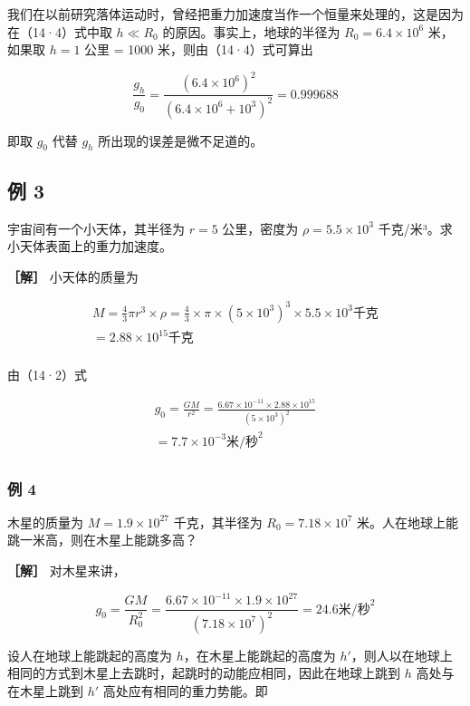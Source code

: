 我们在以前研究落体运动时，曾经把重力加速度当作一个恒量来处理的，这是因为在（14·4）式中取
\(h \ll R_{0}\) 的原因。事实上，地球的半径为
\(R_{0} = 6.4 \times 10^{6}\) 米，如果取 \(h = 1\) 公里 = 1000
米，则由（14·4）式可算出

\[
\frac {g _ {h}}{g _ {0}} = \frac {(6.4 \times 10 ^ {6}) ^ {2}}{(6.4 \times 10 ^ {6} + 10 ^ {3}) ^ {2}} = 0.999688
\]

即取 \(g_0\) 代替 \(g_h\) 所出现的误差是微不足道的。

\subsection{例 3}\label{ux4f8b-3-12}

宇宙间有一个小天体，其半径为 \(r = 5\) 公里，密度为
\(\rho = 5.5 \times 10^{3}\) 千克/米³。求小天体表面上的重力加速度。

\textbf{［解］} 小天体的质量为

\[
\begin{array}{l} M = \frac {4}{3} \pi r ^ {3} \times \rho = \frac {4}{3} \times \pi \times (5 \times 10 ^ {3}) ^ {3} \times 5.5 \times 10 ^ {3} \text{千克} \\ = 2.88 \times 10 ^ {15} \text{千克} \\ \end{array}
\]

由（14·2）式

\[
\begin{array}{l} g _ {0} = \frac {G M}{r ^ {2}} = \frac {6.67 \times 10 ^ {- 11} \times 2.88 \times 10 ^ {15}}{(5 \times 10 ^ {3}) ^ {2}} \\ = 7.7 \times 10 ^ {- 3} \text{米} / \text{秒} ^ {2} \\ \end{array}
\]

\subsubsection{例 4}\label{ux4f8b-4-12}

木星的质量为 \(M = 1.9 \times 10^{27}\) 千克，其半径为
\(R_{0} = 7.18 \times 10^{7}\)
米。人在地球上能跳一米高，则在木星上能跳多高？

\textbf{［解］} 对木星来讲，

\[
g _ {0} = \frac {G M}{R _ {0} ^ {2}} = \frac {6.67 \times 10 ^ {- 11} \times 1.9 \times 10 ^ {27}}{(7.18 \times 10 ^ {7}) ^ {2}} = 24.6 \text{米/秒} ^ {2}
\]

设人在地球上能跳起的高度为 \(h\)，在木星上能跳起的高度为
\(h'\)，则人以在地球上相同的方式到木星上去跳时，起跳时的动能应相同，因此在地球上跳到
\(h\) 高处与在木星上跳到 \(h'\) 高处应有相同的重力势能。即

